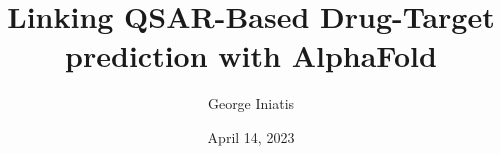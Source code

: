 \documentclass{mpaper}
\begin{document}
\title{Linking QSAR-Based Drug-Target prediction with AlphaFold}
\author{George Iniatis }
\date{April 14, 2023}

\maketitle










{\footnotesize
}
\end{document}
